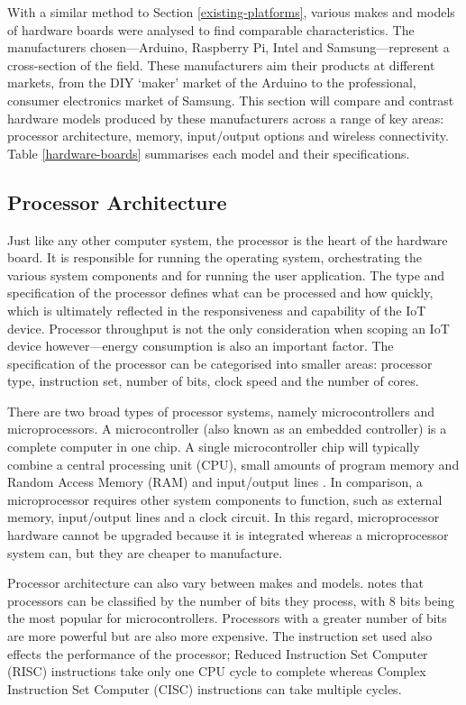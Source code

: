       With a similar method to Section \ref{existing-platforms}, various makes and models of hardware boards were analysed to find comparable characteristics. The manufacturers chosen---Arduino, Raspberry Pi, Intel and Samsung---represent a cross-section of the field. These manufacturers aim their products at different markets, from the DIY `maker' market of the Arduino to the professional, consumer electronics market of Samsung. This section will compare and contrast hardware models produced by these manufacturers across a range of key areas: processor architecture, memory, input/output options and wireless connectivity. Table \ref{hardware-boards} summarises each model and their specifications.

    \subsection{Processor Architecture}
      Just like any other computer system, the processor is the heart of the hardware board. It is responsible for running the operating system, orchestrating the various system components and for running the user application. The type and specification of the processor defines what can be processed and how quickly, which is ultimately reflected in the responsiveness and capability of the IoT device. Processor throughput is not the only consideration when scoping an IoT device however---energy consumption is also an important factor. The specification of the processor can be categorised into smaller areas: processor type, instruction set, number of bits, clock speed and the number of cores.

      There are two broad types of processor systems, namely microcontrollers and microprocessors. A microcontroller (also known as an embedded controller) is a complete computer in one chip. A single microcontroller chip will typically combine a central processing unit (CPU), small amounts of program memory and Random Access Memory (RAM) and input/output lines \citep{microcontrollers:2011}. In comparison, a microprocessor requires other system components to function, such as external memory, input/output lines and a clock circuit. In this regard, microprocessor hardware cannot be upgraded because it is integrated whereas a microprocessor system can, but they are cheaper to manufacture.

      Processor architecture can also vary between makes and models. \citeauthor{microcontrollers:2011} notes that processors can be classified by the number of bits they process, with 8 bits being the most popular for microcontrollers. Processors with a greater number of bits are more powerful but are also more expensive. The instruction set used also effects the performance of the processor; Reduced Instruction Set Computer (RISC) instructions take only one CPU cycle to complete whereas Complex Instruction Set Computer (CISC) instructions can take multiple cycles.

